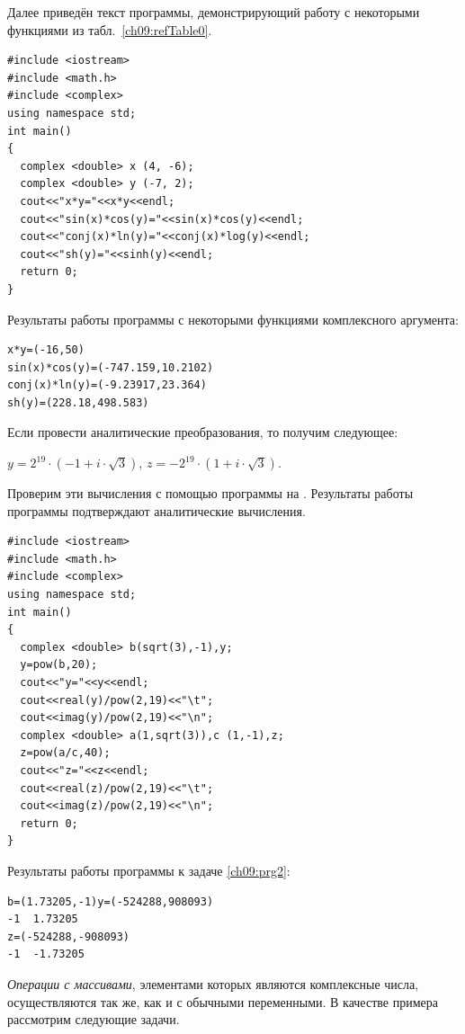 Далее приведён текст программы, демонстрирующий работу с некоторыми функциями из табл.~\ref{ch09:refTable0}. 
\begin{lstlisting}
#include <iostream>
#include <math.h>
#include <complex>
using namespace std;
int main()
{
  complex <double> x (4, -6);
  complex <double> y (-7, 2);
  cout<<"x*y="<<x*y<<endl;
  cout<<"sin(x)*cos(y)="<<sin(x)*cos(y)<<endl;
  cout<<"conj(x)*ln(y)="<<conj(x)*log(y)<<endl;
  cout<<"sh(y)="<<sinh(y)<<endl;
  return 0;
}
\end{lstlisting}

Результаты работы программы с некоторыми функциями комплексного аргумента:
\begin{verbatim}
x*y=(-16,50)
sin(x)*cos(y)=(-747.159,10.2102)
conj(x)*ln(y)=(-9.23917,23.364)
sh(y)=(228.18,498.583)
\end{verbatim}


Если провести аналитические преобразования, то получим следующее:

 $y=2^{19}\cdot (-1+i\cdot \sqrt{3})$,  $z=-2^{19}\cdot (1+i\cdot \sqrt{3})$.

Проверим эти вычисления с помощью программы на . 
Результаты работы программы подтверждают аналитические вычисления.
\begin{lstlisting}
#include <iostream>
#include <math.h>
#include <complex>
using namespace std;
int main()
{
  complex <double> b(sqrt(3),-1),y;
  y=pow(b,20);
  cout<<"y="<<y<<endl;
  cout<<real(y)/pow(2,19)<<"\t";
  cout<<imag(y)/pow(2,19)<<"\n";
  complex <double> a(1,sqrt(3)),c (1,-1),z;
  z=pow(a/c,40);
  cout<<"z="<<z<<endl;
  cout<<real(z)/pow(2,19)<<"\t";
  cout<<imag(z)/pow(2,19)<<"\n";
  return 0;
}
\end{lstlisting}
Результаты работы программы к задаче \ref{ch09:prg2}:
\begin{verbatim}
b=(1.73205,-1)y=(-524288,908093)
-1	1.73205
z=(-524288,-908093)
-1	-1.73205
\end{verbatim}



\emph{Операции с массивами}, элементами которых являются комплексные числа, 
осуществляются так же, как и с обычными
переменными. В качестве примера рассмотрим следующие задачи.

